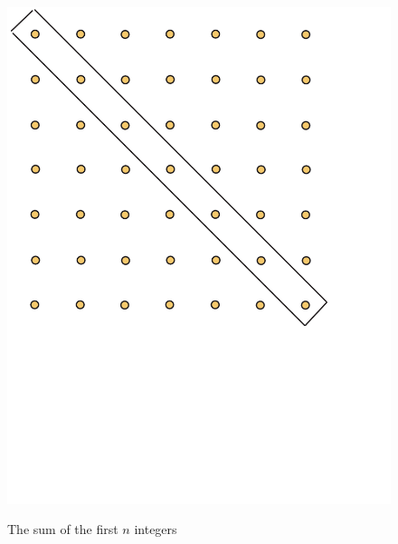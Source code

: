 \begin{figure}
\begin{center}
\includegraphics[viewport=0 280 516 792,scale=.3]{string-figs/3012-fig25}\\
\caption{The sum of the first $n$ integers}
\label{fig:squaredots}
\end{center}
\end{figure}


